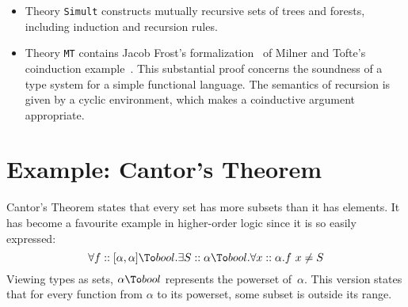 \begin{itemize}
\item Theory {\tt Simult} constructs mutually recursive sets of trees and
  forests, including induction and recursion rules.

\item Theory {\tt MT} contains Jacob Frost's formalization~\cite{frost93} of
  Milner and Tofte's coinduction example~\cite{milner-coind}.  This
  substantial proof concerns the soundness of a type system for a simple
  functional language.  The semantics of recursion is given by a cyclic
  environment, which makes a coinductive argument appropriate.
\end{itemize}


\goodbreak
\section{Example: Cantor's Theorem}\label{sec:chol-cantor}
Cantor's Theorem states that every set has more subsets than it has
elements.  It has become a favourite example in higher-order logic since
it is so easily expressed:
\[  \forall f::[\alpha,\alpha]\To bool. \exists S::\alpha\To bool.
    \forall x::\alpha. f~x \not= S 
\] 
%
Viewing types as sets, $\alpha\To bool$ represents the powerset
of~$\alpha$.  This version states that for every function from $\alpha$ to
its powerset, some subset is outside its range.  

